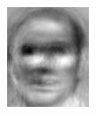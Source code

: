 \begin{frame}
\begin{columns}
\begin{overlayarea}{\textwidth}{\textheight}
{\begin{minipage}[t]{0.15\textwidth}
          \includegraphics[width=\textwidth]{images/eig_docked_image/eig_8.jpeg}
        \end{minipage}

}
\end{overlayarea}
\end{columns}
\end{frame}
